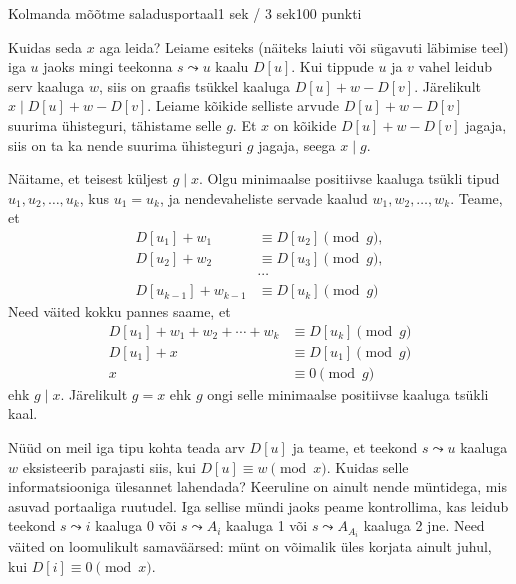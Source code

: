 \begin{yl}{5}{Kolmanda mõõtme saladus}{portaal}{1 sek / 3 sek}{100 punkti}
\begin{center}
  \end{center}

  Kuidas seda $x$ aga leida? Leiame esiteks (näiteks laiuti või sügavuti läbimise teel)
  iga $u$ jaoks mingi teekonna $s \leadsto u$ kaalu $D[u]$. Kui tippude $u$ ja $v$ vahel
  leidub serv kaaluga $w$, siis on graafis tsükkel kaaluga $D[u] + w - D[v]$. Järelikult
  $x \mid D[u] + w - D[v]$. Leiame kõikide selliste arvude $D[u] + w - D[v]$ suurima
  ühisteguri, tähistame selle $g$. Et $x$ on kõikide $D[u] + w - D[v]$
  jagaja, siis on ta ka nende suurima ühisteguri $g$ jagaja, seega $x \mid g$.

  Näitame, et teisest küljest $g \mid x$. Olgu minimaalse positiivse kaaluga tsükli
  tipud $u_1, u_2, \ldots, u_k$, kus $u_1 = u_k$, ja nendevaheliste servade kaalud
  $w_1, w_2, \ldots, w_k$. Teame, et
  \begin{align*}
    D[u_1] + w_1 &\equiv D[u_2] \pmod{g}, \\
    D[u_2] + w_2 &\equiv D[u_3] \pmod{g}, \\
    &\cdots \\
    D[u_{k - 1}] + w_{k - 1} &\equiv D[u_k] \pmod{g}
  \end{align*}
  Need väited kokku pannes saame, et
  \begin{align*}
    D[u_1] + w_1 + w_2 + \cdots + w_k &\equiv D[u_k] \pmod{g} \\
    D[u_1] + x &\equiv D[u_1] \pmod{g} \\
    x &\equiv 0 \pmod{g}
  \end{align*}
  ehk $g \mid x$. Järelikult $g = x$ ehk $g$ ongi selle minimaalse positiivse kaaluga
  tsükli kaal.

  Nüüd on meil iga tipu kohta teada arv $D[u]$ ja teame, et teekond $s \leadsto u$ kaaluga
  $w$ eksisteerib parajasti siis, kui $D[u] \equiv w \pmod{x}$. Kuidas selle informatsiooniga
  ülesannet lahendada? Keeruline on ainult nende müntidega, mis asuvad portaaliga ruutudel.
  Iga sellise mündi jaoks peame kontrollima, kas leidub teekond $s \leadsto i$ kaaluga 0 või
  $s \leadsto A_i$ kaaluga 1 või $s \leadsto A_{A_i}$ kaaluga 2 jne. Need väited on loomulikult
  samaväärsed: münt on võimalik üles korjata ainult juhul, kui $D[i] \equiv 0 \pmod{x}$.
\end{yl}
